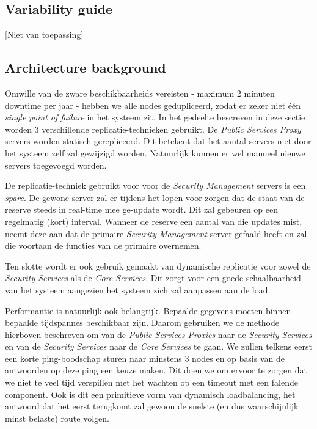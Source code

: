 \documentclass[a4paper,10pt]{article}
\begin{document}
\subsection{Variability guide}
[Niet van toepassing]

\subsection{Architecture background}
\label{subsec:arch_back_dep_serv}
Omwille van de zware beschikbaarheids vereisten - maximum 2 minuten downtime per jaar - hebben we alle nodes gedupliceerd, zodat er zeker niet één \textit{single point of failure} in het systeem zit. In het gedeelte bescreven in deze sectie worden 3 verschillende replicatie-technieken gebruikt. De \textit{Public Services Proxy} servers worden statisch gerepliceerd. Dit betekent dat het aantal servers niet door het systeem zelf zal gewijzigd worden. Natuurlijk kunnen er wel manueel nieuwe servers toegevoegd worden.

De replicatie-techniek gebruikt voor voor de \textit{Security Management} servers is een \textit{spare}. De gewone server zal er tijdens het lopen voor zorgen dat de staat van de reserve steeds in real-time mee ge-update wordt. Dit zal gebeuren op een regelmatig (kort) interval. Wanneer de reserve een aantal van die updates mist, neemt deze aan dat de primaire \textit{Security Management} server gefaald heeft en zal die voortaan de functies van de primaire overnemen.

Ten slotte wordt er ook gebruik gemaakt van dynamische replicatie voor zowel de \textit{Security Services} als de \textit{Core Services}. Dit zorgt voor een goede schaalbaarheid van het systeem aangezien het systeem zich zal aanpassen aan de load.

Performantie is natuurlijk ook belangrijk. Bepaalde gegevens moeten binnen bepaalde tijdspannes beschikbaar zijn. Daarom gebruiken we de methode hierboven beschreven om van de \textit{Public Services Proxies} naar de \textit{Security Services} en van de \textit{Security Services} naar de \textit{Core Services} te gaan. We zullen telkens eerst een korte ping-boodschap sturen naar minstens 3 nodes en op basis van de antwoorden op deze ping een keuze maken. Dit doen we om ervoor te zorgen dat we niet te veel tijd verspillen met het wachten op een timeout met een falende component. Ook is dit een primitieve vorm van dynamisch loadbalancing, het antwoord dat het eerst terugkomt zal gewoon de snelste (en dus waarschijnlijk minst belaste) route volgen.
\end{document}
